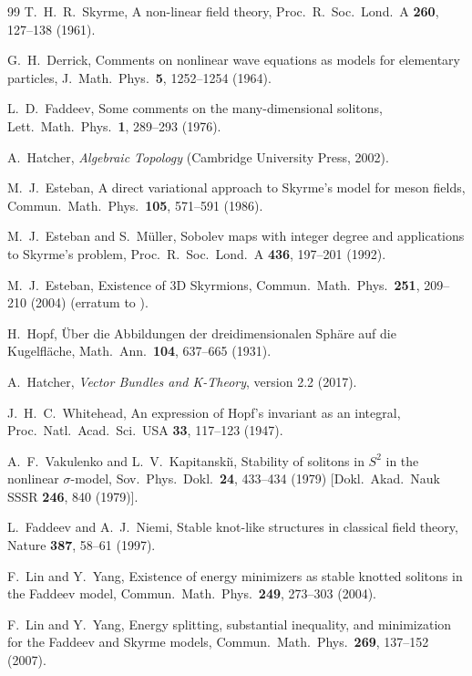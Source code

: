 \documentclass[aps,pra,onecolumn,superscriptaddress,nofootinbib,10pt]{revtex4-2}
\theoremstyle{definition}
\theoremstyle{remark}
\begin{document}
\begin{thebibliography}{99}
 T.~H.~R.~Skyrme, A non-linear field theory, Proc.\ R.\ Soc.\ Lond.\ A \textbf{260}, 127--138 (1961).

 G.~H.~Derrick, Comments on nonlinear wave equations as models for elementary particles, J.\ Math.\ Phys.\ \textbf{5}, 1252--1254 (1964).

 L.~D.~Faddeev, Some comments on the many-dimensional solitons, Lett.\ Math.\ Phys.\ \textbf{1}, 289--293 (1976).

 A.~Hatcher, \emph{Algebraic Topology} (Cambridge University Press, 2002).

 M.~J.~Esteban, A direct variational approach to Skyrme's model for meson fields, Commun.\ Math.\ Phys.\ \textbf{105}, 571--591 (1986).

 M.~J.~Esteban and S.~M\"uller, Sobolev maps with integer degree and applications to Skyrme's problem, Proc.\ R.\ Soc.\ Lond.\ A \textbf{436}, 197--201 (1992).

 M.~J.~Esteban, Existence of 3D Skyrmions, Commun.\ Math.\ Phys.\ \textbf{251}, 209--210 (2004) (erratum to \cite{n6:esteban1986}).

 H.~Hopf, \"Uber die Abbildungen der dreidimensionalen Sph\"are auf die Kugelfl\"ache, Math.\ Ann.\ \textbf{104}, 637--665 (1931).

 A.~Hatcher, \emph{Vector Bundles and K-Theory}, version 2.2 (2017).

 J.~H.~C.~Whitehead, An expression of Hopf's invariant as an integral, Proc.\ Natl.\ Acad.\ Sci.\ USA \textbf{33}, 117--123 (1947).

 A.~F.~Vakulenko and L.~V.~Kapitanski\u{\i}, Stability of solitons in $S^2$ in the nonlinear $\sigma$-model, Sov.\ Phys.\ Dokl.\ \textbf{24}, 433--434 (1979) [Dokl.\ Akad.\ Nauk SSSR \textbf{246}, 840 (1979)].

 L.~Faddeev and A.~J.~Niemi, Stable knot-like structures in classical field theory, Nature \textbf{387}, 58--61 (1997).

 F.~Lin and Y.~Yang, Existence of energy minimizers as stable knotted solitons in the Faddeev model, Commun.\ Math.\ Phys.\ \textbf{249}, 273--303 (2004).

 F.~Lin and Y.~Yang, Energy splitting, substantial inequality, and minimization for the Faddeev and Skyrme models, Commun.\ Math.\ Phys.\ \textbf{269}, 137--152 (2007).


\end{thebibliography}
\end{document}

